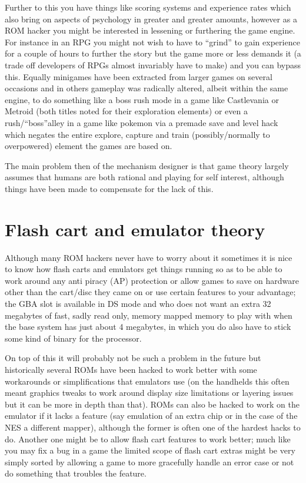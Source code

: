 \documentclass[
]{book}
\begin{document}
Further to this you have things like scoring systems and experience rates which also bring on aspects of psychology in greater and greater amounts, however as a ROM hacker you might be interested in lessening or furthering the game engine. For instance in an RPG you might not wish to have to ``grind'' to gain experience for a couple of hours to further the story but the game more or less demands it (a trade off developers of RPGs almost invariably have to make) and you can bypass this. Equally minigames have been extracted from larger games on several occasions and in others gameplay was radically altered, albeit within the same engine, to do something like a boss rush mode in a game like Castlevania or Metroid (both titles noted for their exploration elements) or even a rush/``boss''alley in a game like pokemon via a premade save and level hack which negates the entire explore, capture and train (possibly/normally to overpowered) element the games are based on.

The main problem then of the mechanism designer is that game theory largely assumes that humans are both rational and playing for self interest, although things have been made to compensate for the lack of this.

\hypertarget{flash-cart-and-emulator-theory}{%
\section{Flash cart and emulator theory}\label{flash-cart-and-emulator-theory}}

Although many ROM hackers never have to worry about it sometimes it is nice to know how flash carts and emulators get things running so as to be able to work around any anti piracy (AP) protection or allow games to save on hardware other than the cart/disc they came on or use certain features to your advantage; the GBA slot is available in DS mode and who does not want an extra 32 megabytes of fast, sadly read only, memory mapped memory to play with when the base system has just about 4 megabytes, in which you do also have to stick some kind of binary for the processor.

On top of this it will probably not be such a problem in the future but historically several ROMs have been hacked to work better with some workarounds or simplifications that emulators use (on the handhelds this often meant graphics tweaks to work around display size limitations or layering issues but it can be more in depth than that). ROMs can also be hacked to work on the emulator if it lacks a feature (say emulation of an extra chip or in the case of the NES a different mapper), although the former is often one of the hardest hacks to do. Another one might be to allow flash cart features to work better; much like you may fix a bug in a game the limited scope of flash cart extras might be very simply sorted by allowing a game to more gracefully handle an error case or not do something that troubles the feature.
\end{document}
